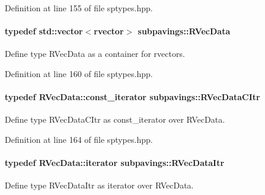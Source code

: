 \-Definition at line 155 of file sptypes.\-hpp.

\hypertarget{namespacesubpavings_a30e15e24c8d81a2160d7422ef3c39d68}{
\paragraph[{\-R\-Vec\-Data}]{\setlength{\rightskip}{0pt plus 5cm}typedef std\-::vector$<$rvector$>$ {\bf subpavings\-::\-R\-Vec\-Data}}}\label{namespacesubpavings_a30e15e24c8d81a2160d7422ef3c39d68}


\-Define type \-R\-Vec\-Data as a container for rvectors. 



\-Definition at line 160 of file sptypes.\-hpp.

\hypertarget{namespacesubpavings_a0e6592215c5f3504143e6c5ac38dcfec}{
\paragraph[{\-R\-Vec\-Data\-C\-Itr}]{\setlength{\rightskip}{0pt plus 5cm}typedef \-R\-Vec\-Data\-::const\-\_\-iterator {\bf subpavings\-::\-R\-Vec\-Data\-C\-Itr}}}\label{namespacesubpavings_a0e6592215c5f3504143e6c5ac38dcfec}


\-Define type \-R\-Vec\-Data\-C\-Itr as const\-\_\-iterator over \-R\-Vec\-Data. 



\-Definition at line 164 of file sptypes.\-hpp.

\hypertarget{namespacesubpavings_aa990935cb163d8eb54f28df1a3508af0}{
\paragraph[{\-R\-Vec\-Data\-Itr}]{\setlength{\rightskip}{0pt plus 5cm}typedef \-R\-Vec\-Data\-::iterator {\bf subpavings\-::\-R\-Vec\-Data\-Itr}}}\label{namespacesubpavings_aa990935cb163d8eb54f28df1a3508af0}


\-Define type \-R\-Vec\-Data\-Itr as iterator over \-R\-Vec\-Data. 



